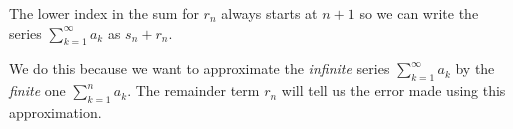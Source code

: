 \documentclass{ximera}
\begin{document}
\begin{exercise}
\begin{exercise}
\begin{feedback}
\begin{image}
\begin{tikzpicture}
      \end{tikzpicture}
  \end{image}
  
  The lower index in the sum for $r_n$ always starts at $n+1$ so we can write the series $ \sum_{k=1}^{\infty} a_k$ as $s_n +r_n$.
  
  We do this because we want to approximate the \emph{infinite} series $\sum_{k=1}^{\infty} a_k$ by the \emph{finite} one $ \sum_{k=1}^{n} a_k$.  The remainder term $r_n$ will tell us the error made using this approximation.
\end{feedback}


\end{exercise}

\end{exercise}
\end{document}
